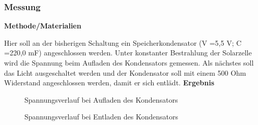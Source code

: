     \subsubsection{Messung}                                             %
        \textbf{Methode/Materialien}
        \newline
        \par Hier soll an der bisherigen Schaltung ein Speicherkondensator (V =5,5 V; C =220,0 mF) angeschlossen
        werden. Unter konstanter Bestrahlung der Solarzelle wird die Spannung beim Aufladen des
        Kondensators gemessen. Als nächstes soll das Licht ausgeschaltet werden und der Kondensator soll mit
        einem 500 Ohm Widerstand angeschlossen werden, damit er sich entlädt.
        \vspace{4mm}
        \newline
        \textbf{Ergebnis}
        \newline
        \par
        \begin{figure}[H]
            \def\svgwidth{\textwidth}
            
            
            \caption{Spannungsverlauf bei Aufladen des Kondensators}
        \end{figure}
        \begin{figure}[H]
            \def\svgwidth{\textwidth}
            
            
            \caption{Spannungsverlauf bei Entladen des Kondensators}
        \end{figure}
        
        \clearpage
